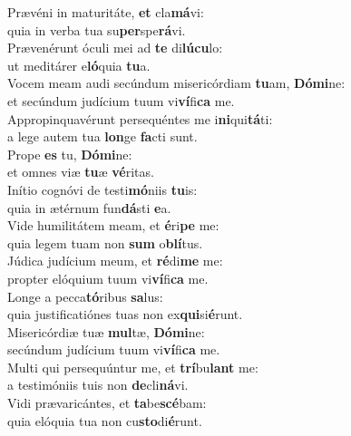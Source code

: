 \oddverse Prævéni in maturitáte, \textbf{et} cla\textbf{má}vi:~\*\\
\oddverse quia in verba tua su\textbf{per}spe\textbf{rá}vi.\\
\evenverse Prævenérunt óculi mei ad \textbf{te} di\textbf{lú}\textbf{cu}lo:~\*\\
\evenverse ut meditárer e\textbf{ló}quia \textbf{tu}a.\\
\oddverse Vocem meam audi secúndum misericórdiam \textbf{tu}am, \textbf{Dó}\textbf{mi}ne:~\*\\
\oddverse et secúndum judícium tuum vi\textbf{ví}fi\textbf{ca} me.\\
\evenverse Appropinquavérunt persequéntes me i\textbf{ni}qui\textbf{tá}ti:~\*\\
\evenverse a lege autem tua \textbf{lon}ge \textbf{fa}cti sunt.\\
\oddverse Prope \textbf{es} tu, \textbf{Dó}\textbf{mi}ne:~\*\\
\oddverse et omnes viæ \textbf{tu}æ \textbf{vé}ritas.\\
\evenverse Inítio cognóvi de testi\textbf{mó}niis \textbf{tu}is:~\*\\
\evenverse quia in ætérnum fun\textbf{dá}sti \textbf{e}a.\\
\oddverse Vide humilitátem meam, et \textbf{é}ri\textbf{pe} me:~\*\\
\oddverse quia legem tuam non \textbf{sum} o\textbf{blí}tus.\\
\evenverse Júdica judícium meum, et \textbf{ré}di\textbf{me} me:~\*\\
\evenverse propter elóquium tuum vi\textbf{ví}fi\textbf{ca} me.\\
\oddverse Longe a pecca\textbf{tó}ribus \textbf{sa}lus:~\*\\
\oddverse quia justificatiónes tuas non ex\textbf{qui}si\textbf{é}runt.\\
\evenverse Misericórdiæ tuæ \textbf{mul}tæ, \textbf{Dó}\textbf{mi}ne:~\*\\
\evenverse secúndum judícium tuum vi\textbf{ví}fi\textbf{ca} me.\\
\oddverse Multi qui persequúntur me, et \textbf{trí}bu\textbf{lant} me:~\*\\
\oddverse a testimóniis tuis non \textbf{de}cli\textbf{ná}vi.\\
\evenverse Vidi prævaricántes, et \textbf{ta}be\textbf{scé}bam:~\*\\
\evenverse quia elóquia tua non cu\textbf{sto}di\textbf{é}runt.\\
